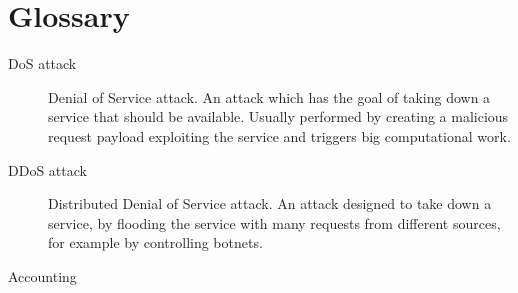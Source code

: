\chapter*{Glossary}


\begin{description}
  \item[DoS attack] Denial of Service attack. An attack which has the goal of taking down a service that should be available. Usually performed by creating a malicious request payload exploiting the service and triggers big computational work.
  \item[DDoS attack] Distributed Denial of Service attack. An attack designed to take down a service, by flooding the service with many requests from different sources, for example by controlling botnets.
  \item[Accounting]
\end{description}
